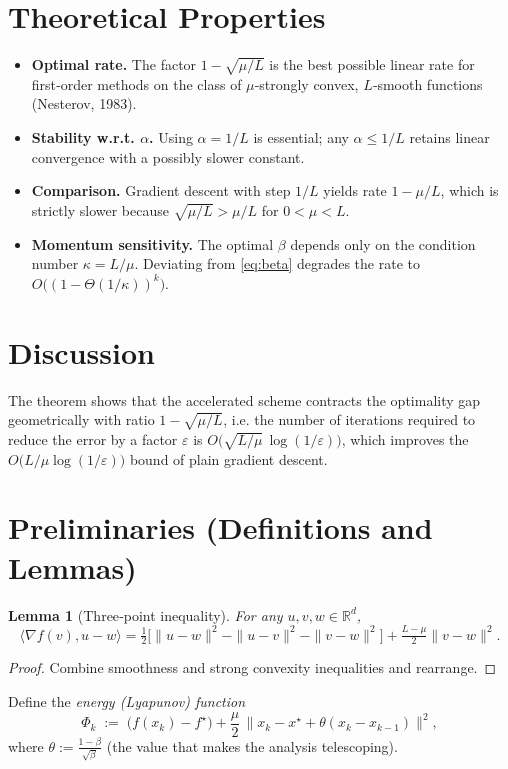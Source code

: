 \documentclass{article}
\newtheorem{lemma}{Lemma}
\newcommand{\grad}{\nabla}
\begin{document}
\section*{Theoretical Properties}
\begin{itemize}[leftmargin=*]
\item \textbf{Optimal rate.} The factor $1-\sqrt{\mu/L}$ is the best possible linear rate for first‑order methods on the class of $\mu$‑strongly convex, $L$‑smooth functions (Nesterov, 1983).
\item \textbf{Stability w.r.t. $\alpha$.} Using $\alpha=1/L$ is essential; any $\alpha\le 1/L$ retains linear convergence with a possibly slower constant.
\item \textbf{Comparison.} Gradient descent with step $1/L$ yields rate $1-\mu/L$, which is strictly slower because $\sqrt{\mu/L}>\mu/L$ for $0<\mu<L$.
\item \textbf{Momentum sensitivity.} The optimal $\beta$ depends only on the condition number $\kappa=L/\mu$. Deviating from \eqref{eq:beta} degrades the rate to $O\bigl((1-\Theta(1/\kappa))^{k}\bigr)$.
\end{itemize}

\section*{Discussion}
The theorem shows that the accelerated scheme contracts the optimality gap geometrically with ratio $1-\sqrt{\mu/L}$, i.e. the number of iterations required to reduce the error by a factor $\varepsilon$ is $O\!\bigl(\sqrt{L/\mu}\,\log(1/\varepsilon)\bigr)$, which improves the $O\!\bigl(L/\mu\log(1/\varepsilon)\bigr)$ bound of plain gradient descent.

\newpage
\section*{Preliminaries (Definitions and Lemmas)}
\begin{lemma}[Three‑point inequality]\label{lem:three}
For any $u,v,w\in\mathbb{R}^d$,
\[
\langle \grad f(v),u-w\rangle
= \tfrac12\bigl[\|u-w\|^2-\|u-v\|^2-\|v-w\|^2\bigr]
    +\tfrac{L-\mu}{2}\|v-w\|^2 .
\]
\end{lemma}
\begin{proof}
Combine smoothness and strong convexity inequalities and rearrange. \qedhere
\end{proof}

Define the \emph{energy (Lyapunov) function}
\[
\Phi_k \;:=\; 
\bigl(f(x_k)-f^\star\bigr)
+ \frac{\mu}{2}\,\|x_k - x^\star + \theta (x_k-x_{k-1})\|^2 ,
\]
where $\theta:=\frac{1-\beta}{\sqrt{\beta}}$ (the value that makes the analysis telescoping).  
\end{document}

